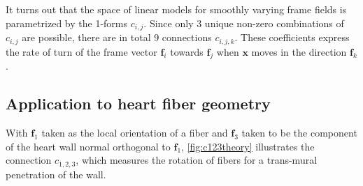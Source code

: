 It turns out that the space of linear models for smoothly varying frame fields is parametrized by the 1-forms $c_{i,j}$. Since only 3 unique non-zero combinations of $c_{i,j}$ are possible, there are in total 9 connections $c_{i,j,k}$. These coefficients express the rate of turn of the frame vector $\mathbf{f}_i$ towards $\mathbf{f}_j$ when $\mathbf{x}$ moves in the direction $\mathbf{f}_k$. 

\subsection{Application to heart fiber geometry}

With $\mathbf{f}_1$ taken as the local orientation of a fiber and $\mathbf{f}_3$ taken to be the component of the heart wall normal orthogonal to $\mathbf{f}_1$, \ref{fig:c123theory} illustrates the connection $c_{1,2,3}$, which measures the rotation of fibers for a trans-mural penetration of the wall.\\

